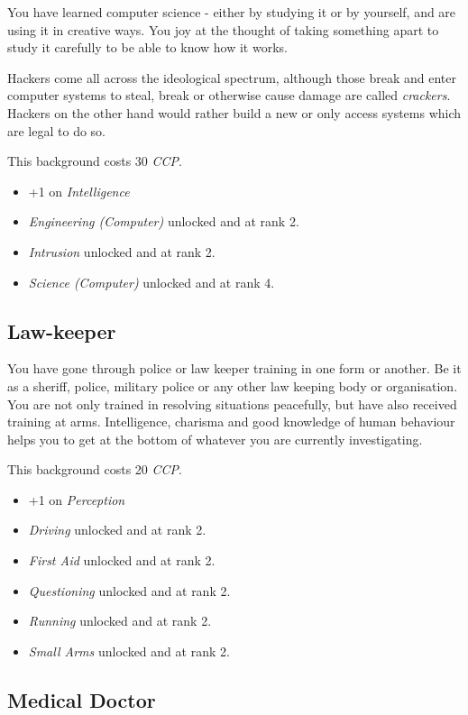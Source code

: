 You have learned computer science - either by studying it or by yourself,
and are using it in creative ways. You joy at the thought of taking something
apart to study it carefully to be able to know how it works.

Hackers come all across the ideological spectrum, although those break and
enter computer systems to steal, break or otherwise cause damage are called
\emph{crackers}. Hackers on the other hand would rather build a new or only
access systems which are legal to do so.

This background costs 30 \emph{CCP}.

\begin{itemize}
\item +1 on \emph{Intelligence}
\item \emph{Engineering (Computer)} unlocked and at rank 2.
\item \emph{Intrusion} unlocked and at rank 2.
\item \emph{Science (Computer)} unlocked and at rank 4.
\end{itemize}

\subsection{Law-keeper}

You have gone through police or law keeper training in one form or another. Be
it as a sheriff, police, military police or any other law keeping body or
organisation. You are not only trained in resolving situations peacefully,
but have also received training at arms. Intelligence, charisma and good
knowledge of human behaviour helps you to get at the bottom of whatever you
are currently investigating.

This background costs 20 \emph{CCP}.

\begin{itemize}
\item +1 on \emph{Perception}
\item \emph{Driving} unlocked and at rank 2.
\item \emph{First Aid} unlocked and at rank 2.
\item \emph{Questioning} unlocked and at rank 2.
\item \emph{Running} unlocked and at rank 2.
\item \emph{Small Arms} unlocked and at rank 2.
\end{itemize}

\subsection{Medical Doctor}

